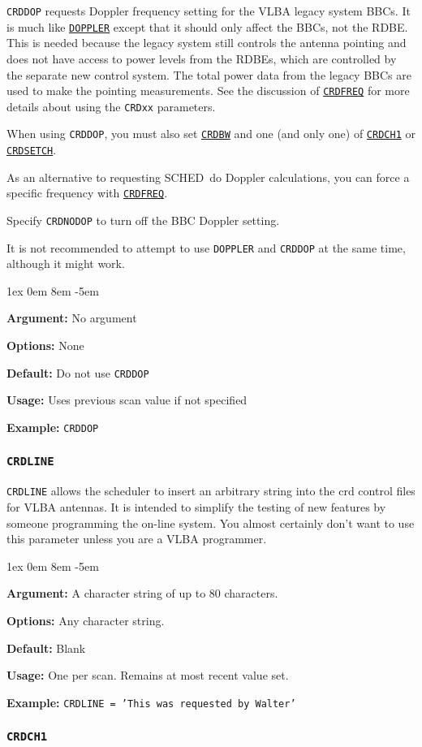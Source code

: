 \documentclass{report}
\newcommand{\schedb}{{\sc SCHED~}}
\newcommand{\rcwbox}[5]{
  \begin{list}{}{\parsep 1ex  \itemsep 0em
                 \leftmargin 8em  \itemindent -5em }
    \item {\bf Argument:} #1
    \item {\bf Options:}  #2
    \item {\bf Default:}  #3
    \item {\bf Usage:}    #4
    \item {\bf Example:}  #5
  \end{list}
}
\begin{document}
{\tt CRDDOP} requests Doppler frequency setting for the VLBA legacy
system BBCs.  It is much like 
{\hyperref[MP:DOPPLER]{{\tt DOPPLER}}}
except that it should only affect the BBCs, not the RDBE.  This is
needed because the legacy system still controls the antenna pointing
and does not have access to power levels from the RDBEs, which are
controlled by the separate new control system.  The total power 
data from the legacy BBCs are used to make the pointing measurements.
See the discussion of 
{\hyperref[MP:CRDFREQ]{{\tt CRDFREQ}}} for more
details about using the {\tt CRDxx} parameters.

When using {\tt CRDDOP}, you must also set 
{\hyperref[MP:CRDBW]{{\tt CRDBW}}} and one (and only one) of 
{\hyperref[MP:CRDCH1]{{\tt CRDCH1}}}
or 
{\hyperref[MP:CRDSETCH]{{\tt CRDSETCH}}}.  

As an alternative to requesting \schedb do Doppler
calculations, you can force a specific frequency with 
{\hyperref[MP:CRDFREQ]{{\tt CRDFREQ}}}.

Specify {\tt CRDNODOP} to turn off the BBC Doppler setting.

It is not recommended to attempt to use {\tt DOPPLER} and {\tt CRDDOP}
at the same time, although it might work.

\rcwbox
{No argument}
{None}
{Do not use {\tt CRDDOP}}
{Uses previous scan value if not specified}
{{\tt CRDDOP}}

\subsubsection{\label{MP:CRDLINE}{\tt CRDLINE}}

{\tt CRDLINE} allows the scheduler to insert an arbitrary string
into the crd control files for VLBA antennas.  It is intended to
simplify the testing of new features by someone programming the
on-line system.  You almost certainly don't want to use this parameter
unless you are a VLBA programmer.

\rcwbox
{A character string of up to 80 characters.}
{Any character string.}
{Blank}
{One per scan.  Remains at most recent value set.}
{{\tt CRDLINE = 'This was requested by Walter'}}


\subsubsection{\label{MP:CRDCH1}{\tt CRDCH1}}
\end{document}
